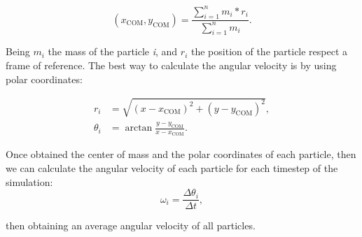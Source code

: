 \begin{equation}
  (x_{\mathrm{COM}}, y_{\mathrm{COM}}) = \displaystyle\frac{\sum^{n}_{i=1} m_i * r_i}{\sum^{n}_{i=1} m_i}.
  \label{eq:centerofmass}
\end{equation}

Being $m_i$ the mass of the particle \textit{i}, and $r_i$ the position of the particle respect a frame of reference. The best way to calculate the angular velocity is by using polar coordinates:

\begin{align}
  r_i & = \sqrt{(x - x_{\mathrm{COM}})^2 + (y - y_{\mathrm{COM}})^2},\\ 
  \theta _i &= \arctan{\frac{y - y_{\mathrm{COM}}}{x - x_{\mathrm{COM}}}}.
\end{align}

Once obtained the center of mass and the polar coordinates of each particle, then we can calculate the angular velocity of each particle for each timestep of the simulation:
\begin{equation}
  \omega _i = \frac{\Delta \theta _i}{\Delta t},
  \label{eq:angularvelocity}
\end{equation}

then obtaining an average angular velocity of all particles.

